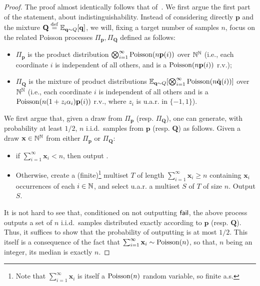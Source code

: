\documentclass[10pt]{article}
\newcommand{\p}{\mathbf{p}}
\newcommand{\q}{\mathbf{q}}
\newcommand{\bigq}{\mathbf{Q}}
\newcommand{\ns}{n}
\begin{document}
\begin{proof}
The proof almost identically follows that of~\cite[Theorem 4.2]{ValiantV17}. We first argue the first part of the statement, about indistinguishability. Instead of considering directly $\p$ and the mixture $\bigq \eqdef \shortexpect_{\q\sim Q}[\q]$, we will, fixing a target number of samples $\ns$, focus on the related Poisson processes $\Pi_\p,\Pi_{\bigq}$ defined as follows:
\begin{itemize}
  \item $\Pi_\p$ is the product distribution $\bigotimes_{i=1}^\infty \poisson{\ns\p(i)}$ over $\mathbb{N}^{\mathbb{N}}$ (i.e., each coordinate $i$ is independent of all others, and is a $\poisson{\ns\p(i)}$ r.v.);
  \item $\Pi_{\bigq}$ is the mixture of product distributions $\shortexpect_{\q\sim Q}[\bigotimes_{i=1}^\infty \poisson{\ns\tilde{\q}(i)}]$ over $\mathbb{N}^{\mathbb{N}}$ (i.e., each coordinate $i$ is independent of all others and is a $\poisson{\ns(1+z_i\alpha_i)\p(i)}$ r.v., where $z_i$ is u.a.r. in $\{-1,1\}$).
\end{itemize}
We first argue that, given a draw from $\Pi_\p$ (resp. $\Pi_{\bigq}$), one can generate, with probability at least $1/2$, $\ns$ i.i.d.\ samples from $\p$ (resp. $\bigq$) as follows. Given a draw $\mathbf{x}\in\mathbb{N}^{\mathbb{N}}$ from either $\Pi_\p$ or $\Pi_{\bigq}$:
\begin{itemize}
  \item if $\sum_{i=1}^\infty \mathbf{x}_i < \ns$, then output \fail.
  \item Otherwise, create a (finite)\footnote{Note that $\sum_{i=1}^\infty \mathbf{x}_i$ is itself a $\poisson{\ns}$ random variable, so finite a.s.} multiset $T$ of length $\sum_{i=1}^\infty \mathbf{x}_i\geq \ns$ containing $\mathbf{x}_i$ occurrences of each $i\in\mathbb{N}$, and select u.a.r. a multiset $S$ of $T$ of size $\ns$. Output $S$.
\end{itemize}
It is not hard to see that, conditioned on not outputting $\textsf{fail}$, the above process outputs a set of $\ns$ i.i.d.\ samples distributed exactly according to $\p$ (resp. $\bigq$). Thus, it suffices to show that the probability of outputting \fail is at most $1/2$. This itself is a consequence of the fact that $\sum_{i=1}^\infty \mathbf{x}_i\sim \poisson{\ns}$, so that, $\ns$ being an integer, its median is exactly $\ns$.


\end{proof}
\end{document}
